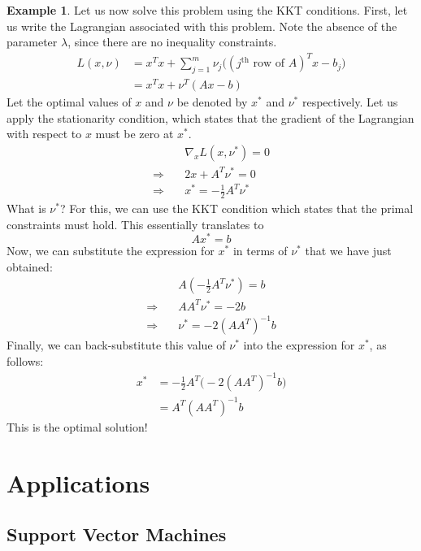 \documentclass[a4paper]{article}
\theoremstyle{definition}
\newtheorem{example}{Example}[section]
\begin{document}
\begin{example}
	Let us now solve this problem using the KKT conditions.
	First, let us write the Lagrangian associated with this problem.
	Note the absence of the parameter $\lambda$, since there are no inequality constraints.
	\begin{align*}
		L(x, \nu) & = x^T x + \sum_{j=1}^m \nu_j \big( (j^\text{th} \text{ row of } A)^T x - b_j \big) \\
		& = x^T x + \nu^T (Ax - b)
	\end{align*}
	Let the optimal values of $x$ and $\nu$ be denoted by $x^*$ and $\nu^*$ respectively.
	Let us apply the stationarity condition, which states that the gradient of the Lagrangian with respect to $x$ must be zero at $x^*$.
	\begin{align*}
		& \nabla_x L(x, \nu^*) = 0 \\
		\Rightarrow \quad & 2x + A^T \nu^* = 0 \\
		\Rightarrow \quad & x^* = -\frac{1}{2} A^T \nu^*
	\end{align*}
	What is $\nu^*$?
	For this, we can use the KKT condition which states that the primal constraints must hold.
	This essentially translates to
	\begin{equation*}
		Ax^* = b
	\end{equation*}
	Now, we can substitute the expression for $x^*$ in terms of $\nu^*$ that we have just obtained:
	\begin{align*}
		& A \left( -\frac{1}{2} A^T \nu^* \right) = b \\
		\Rightarrow \quad & A A^T \nu^* = -2b \\
		\Rightarrow \quad & \nu^* = -2 (A A^T)^{-1} b
	\end{align*}
	Finally, we can back-substitute this value of $\nu^*$ into the expression for $x^*$, as follows:
	\begin{align*}
		x^* & = -\frac{1}{2} A^T \big( -2 (A A^T)^{-1} b \big) \\
		& = A^T (A A^T)^{-1} b
	\end{align*}
	This is the optimal solution!
\end{example}

\section{Applications}

\subsection{Support Vector Machines}
\end{document}
